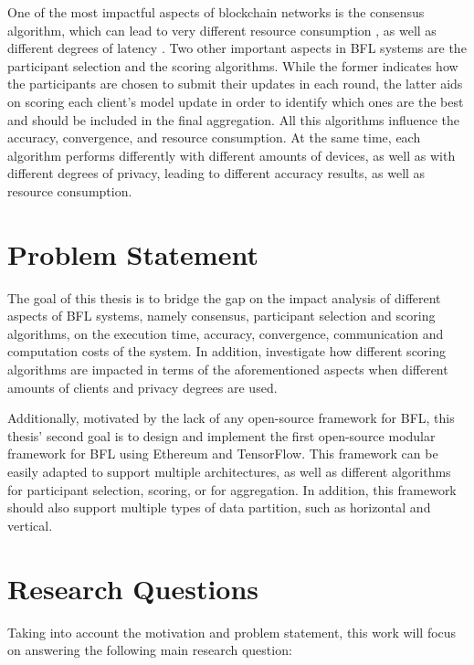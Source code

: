 One of the most impactful aspects of blockchain networks is the consensus algorithm, which can lead to very different resource consumption \cite{ccaf}, as well as different degrees of latency \cite{Alqahtani_2021}. Two other important aspects in BFL systems are the participant selection and the scoring algorithms. While the former indicates how the participants are chosen to submit their updates in each round, the latter aids on scoring each client's model update in order to identify which ones are the best and should be included in the final aggregation. All this algorithms influence the accuracy, convergence, and resource consumption. At the same time, each algorithm performs differently with different amounts of devices, as well as with different degrees of privacy, leading to different accuracy results, as well as resource consumption.

\section{Problem Statement}\label{intro:problem}

The goal of this thesis is to bridge the gap on the impact analysis of different aspects of BFL systems, namely consensus, participant selection and scoring algorithms, on the execution time, accuracy, convergence, communication and computation costs of the system. In addition, investigate how different scoring algorithms are impacted in terms of the aforementioned aspects when different amounts of clients and privacy degrees are used.

Additionally, motivated by the lack of any open-source framework for BFL, this thesis' second goal is to design and implement the first open-source modular framework for BFL using Ethereum\cite{wood2014ethereum} and TensorFlow\cite{tensorflow2015-whitepaper}. This framework can be easily adapted to support multiple architectures, as well as different algorithms for participant selection, scoring, or for aggregation. In addition, this framework should also support multiple types of data partition, such as horizontal and vertical.

\section{Research Questions}\label{intro:questions}

Taking into account the motivation and problem statement, this work will focus on answering the following main research question:

